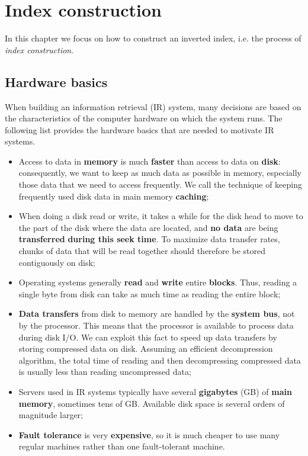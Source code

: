 \section{Index construction}\label{ch5}
In this chapter we focus on how to construct an inverted index, i.e. the process of \textit{index construction}.

\subsection{Hardware basics}
When building an information retrieval (IR) system, many decisions are based on the characteristics of the computer hardware on which the system runs. The following list provides the hardware basics that are needed to motivate IR systems.

\begin{itemize}
    \item Access to data in \textbf{memory} is much \textbf{faster} than access to data on \textbf{disk}: consequently, we want to keep as much data as possible in memory, especially those data that we need to access frequently. We call the technique of keeping frequently used disk data in main memory \textbf{caching};
    \item When doing a disk read or write, it takes a while for the disk head to move to the part of the disk where the data are located, and \textbf{no data} are being \textbf{transferred} \textbf{during this seek time}. To maximize data transfer rates, chunks of data that will be read together should therefore be stored contiguously on disk;
    \item Operating systems generally \textbf{read} and \textbf{write} entire \textbf{blocks}. Thus, reading a single byte from disk can take as much time as reading the entire block;
    \item \textbf{Data transfers} from disk to memory are handled by the \textbf{system bus}, not by the processor. This means that the processor is available to process data during disk I/O. We can exploit this fact to speed up data transfers by storing compressed data on disk. Assuming an efficient decompression algorithm, the total time of reading and then decompressing compressed data is usually less than reading uncompressed data;
    \item Servers used in IR systems typically have several \textbf{gigabytes} (GB) of \textbf{main memory}, sometimes tens of GB. Available disk space is several orders of magnitude larger;
    \item \textbf{Fault tolerance} is very \textbf{expensive}, so it is much cheaper to use many regular machines rather than one fault-tolerant machine.
\end{itemize}

